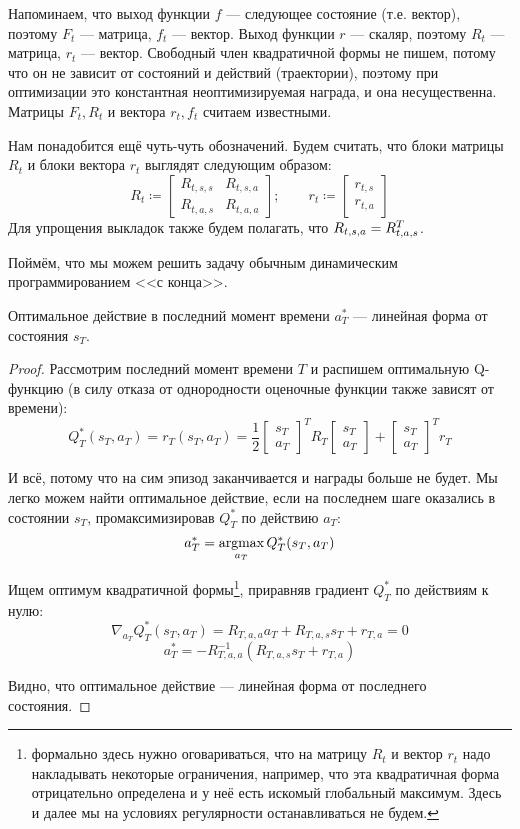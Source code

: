 Напоминаем, что выход функции $f$ --- следующее состояние (т.е. вектор), поэтому $F_t$ --- матрица, $f_t$ --- вектор. Выход функции $r$ --- скаляр, поэтому $R_t$ --- матрица, $r_t$ --- вектор. Свободный член квадратичной формы не пишем, потому что он не зависит от состояний и действий (траектории), поэтому при оптимизации это константная неоптимизируемая награда, и она несущественна. Матрицы $F_t, R_t$ и вектора $r_t, f_t$ считаем известными. 

Нам понадобится ещё чуть-чуть обозначений. Будем считать, что блоки матрицы $R_t$ и блоки вектора $r_t$ выглядят следующим образом:
$$R_t \coloneqq \begin{bmatrix} R_{t, s, s} & R_{t, s, a} \\ R_{t, a, s} & R_{t, a, a} \end{bmatrix}; \qquad r_t \coloneqq \begin{bmatrix} r_{t, s} \\ r_{t, a} \end{bmatrix}$$
Для упрощения выкладок также будем полагать, что $R_{t, s, a} \HM= R^T_{t, a, s}$.

Поймём, что мы можем решить задачу обычным динамическим программированием <<с конца>>.
\begin{theorem}
Оптимальное действие в последний момент времени $a_T^*$ --- линейная форма от состояния $s_T$.
\begin{proof}
Рассмотрим последний момент времени $T$ и распишем оптимальную Q-функцию (в силу отказа от однородности оценочные функции также зависят от времени):
$$Q^*_T(s_T, a_T) = r_T(s_T, a_T) = \frac{1}{2} \begin{bmatrix} s_T \\ a_T \end{bmatrix}^T R_T \begin{bmatrix} s_T \\ a_T \end{bmatrix} + \begin{bmatrix} s_T \\ a_T \end{bmatrix}^T r_T$$

И всё, потому что на сим эпизод заканчивается и награды больше не будет. Мы легко можем найти оптимальное действие, если на последнем шаге оказались в состоянии $s_T$, промаксимизировав $Q^*_T$ по действию $a_T$:
$$a^*_T = \mathop{\mathrm{argmax}}_{a_T} Q^*_T(s_T, a_T)$$

Ищем оптимум квадратичной формы\footnote{формально здесь нужно оговариваться, что на матрицу $R_t$ и вектор $r_t$ надо накладывать некоторые ограничения, например, что эта квадратичная форма отрицательно определена и у неё есть искомый глобальный максимум. Здесь и далее мы на условиях регулярности останавливаться не будем.}, приравняв градиент $Q^*_T$ по действиям к нулю:
$$\nabla_{a_T} Q^*_T(s_T, a_T) = R_{T, a, a} a_T + R_{T, a, s}s_T + r_{T, a} = 0$$
$$a^*_T = -R_{T, a, a}^{-1} \left( R_{T, a, s}s_T + r_{T, a} \right)$$

Видно, что оптимальное действие --- линейная форма от последнего состояния. 
\end{proof}
\end{theorem}

